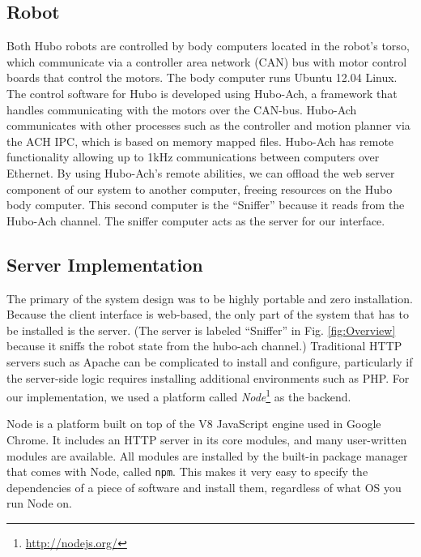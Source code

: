 \documentclass[letterpaper, 10 pt, conference]{ieee/ieeeconf}  %
\begin{document}
\subsection{Robot}

Both Hubo robots are controlled by body computers located in the robot's torso, which communicate via a controller area network (CAN) bus with motor control boards that control the motors.
The body computer runs Ubuntu 12.04 Linux.
The control software for Hubo is developed using Hubo-Ach, a framework that handles communicating with the motors over the CAN-bus.\cite{lofaro2013unified}
Hubo-Ach communicates with other processes such as the controller and motion planner via the ACH IPC, which is based on memory mapped files.\cite{dantam2012robust}
Hubo-Ach has remote functionality allowing up to 1kHz communications between computers over Ethernet.
By using Hubo-Ach's remote abilities, we can offload the web server component of our system to another computer, freeing resources on the Hubo body computer.
This second computer is the ``Sniffer'' because it reads from the Hubo-Ach channel.
The sniffer computer acts as the server for our interface.

\subsection{Server Implementation}
The primary of the system design was to be highly portable and zero installation.
Because the client interface is web-based, the only part of the system that has to be installed is the server.
(The server is labeled ``Sniffer'' in Fig. \ref{fig:Overview} because it sniffs the robot state from the hubo-ach channel.)
Traditional HTTP servers such as Apache can be complicated to install and configure, particularly if the server-side logic requires installing additional environments such as PHP.
For our implementation, we used a platform called \textit{Node}\footnote{\url{http://nodejs.org/}} as the backend.

Node is a platform built on top of the V8 JavaScript engine used in Google Chrome.
It includes an HTTP server in its core modules, and many user-written modules are available.
All modules are installed by the built-in package manager that comes with Node, called \texttt{npm}.
This makes it very easy to specify the dependencies of a piece of software and install them, regardless of what OS you run Node on.
\end{document}
